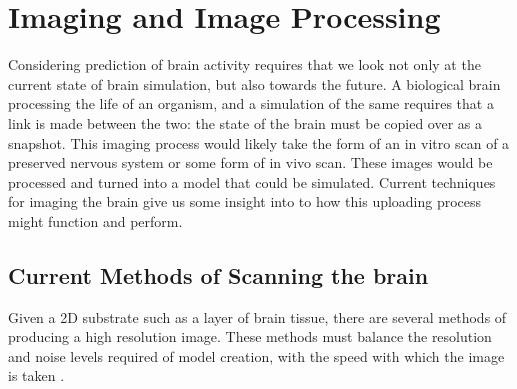 \section{Imaging and Image Processing}

Considering prediction of brain activity requires that we look not only at the
current state of brain simulation, but also towards the future. A biological
brain processing the life of an organism, and a simulation of the same requires
that a link is made between the two: the state of the brain must be copied over as a
snapshot. This imaging process would likely take the form of an in vitro scan of
a preserved nervous system or some form of in vivo scan. These images would be
processed and turned into a model that could be simulated. Current techniques for imaging the brain give us some insight into to how this
uploading process might function and perform.

\subsection{Current Methods of Scanning the brain}

Given a 2D substrate such as a layer of brain tissue, there are several methods
of producing a high resolution image. These methods must balance the resolution
and noise levels required of model creation, with the speed with which the image
is taken \autocite{bostrom_whole_2008,mikula_progress_2016}.

